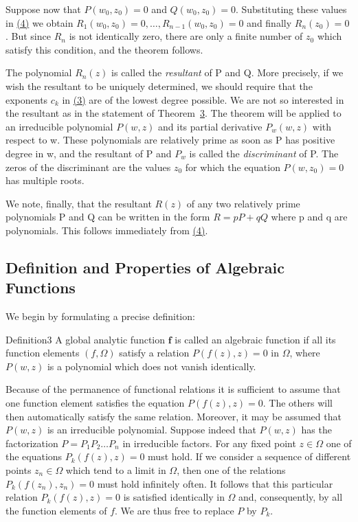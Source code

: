 Suppose now that $P(w_0, z_0) = 0$ and $Q(w_0, z_0) = 0$. Substituting these values in \hyperref[eq:8.4]{(4)} we obtain $R_1(w_0, z_0) = 0, \ldots, R_{n-1}(w_0, z_0) = 0$ and finally $R_n(z_0) = 0$. But since $R_n$ is not identically zero, there are only a finite number of $z_0$ which satisfy this condition, and the theorem follows.

The polynomial $R_{n}(z)$ is called the \emph{resultant} of P and Q. More precisely, if we wish the resultant to be uniquely determined, we should require that the exponents $c_{k}$ in \hyperref[eq:8.3]{(3)} are of the lowest degree possible. We are not so interested in the resultant as in the statement of Theorem~\hyperref[thm:8.3]{3}. The theorem will be applied to an irreducible polynomial $P(w,z)$ and its partial derivative $P_{w}(w,z)$ with respect to w. These polynomials are relatively prime as soon as P has positive degree in w, and the resultant of P and $P_{w}$ is called the \emph{discriminant} of P. The zeros of the discriminant are the values $z_{0}$ for which the equation $P(w,z_{0}) = 0$ has multiple roots.

We note, finally, that the resultant $R(z)$ of any two relatively prime polynomials P and Q can be written in the form $R = pP + qQ$ where p and q are polynomials. This follows immediately from \hyperref[eq:8.4]{(4)}.

\setcounter{section}{2}\setcounter{subsection}{1}\subsection{Definition and Properties of Algebraic Functions}\label{sec:8.2.2}
We begin by formulating a precise definition:

\begin{originalstatement}{Definition}{3}\label{def:8.3}
A global analytic function $\mathbf{f}$ is called an algebraic function if all its function elements $(f,\Omega)$ satisfy a relation $P(f(z),z) = 0$ in $\Omega$,
where $P(w,z)$ is a polynomial which does not vanish identically.

\end{originalstatement}
Because of the permanence of functional relations it is sufficient to assume that one function element satisfies the equation $P(f(z),z) = 0$. The others will then automatically satisfy the same relation. Moreover, it may be assumed that $P(w,z)$ is an irreducible polynomial. Suppose indeed that $P(w,z)$ has the factorization $P = P_1P_2\ldots P_n$ in irreducible factors. For any fixed point $z \in \Omega$ one of the equations $P_k(f(z),z) = 0$ must hold. If we consider a sequence of different points $z_n \in \Omega$ which tend to a limit in $\Omega$, then one of the relations $P_k(f(z_n),z_n)=0$ must hold infinitely often. It follows that this particular relation $P_k(f(z),z) = 0$ is satisfied identically in $\Omega$ and, consequently, by all the function elements of $f$. We are thus free to replace $P$ by $P_k$.

